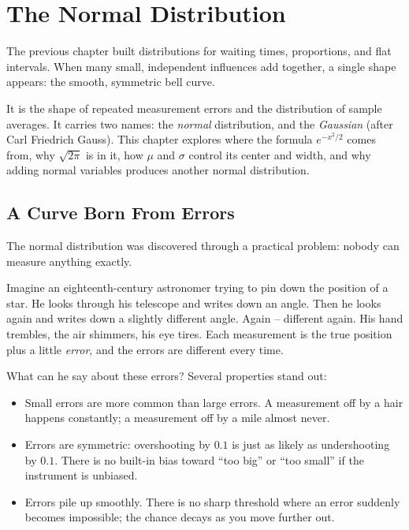 \chapter{The Normal Distribution}

The previous chapter built distributions for waiting times, proportions, and flat intervals. When many small, independent influences add together, a single shape appears: the smooth, symmetric bell curve.

It is the shape of repeated measurement errors and the distribution of sample averages. It carries two names: the \emph{normal} distribution, and the \emph{Gaussian} (after Carl Friedrich Gauss). This chapter explores where the formula $e^{-x^2/2}$ comes from, why $\sqrt{2\pi}$ is in it, how $\mu$ and $\sigma$ control its center and width, and why adding normal variables produces another normal distribution.

\chapterline

\section{A Curve Born From Errors}
\label{ch12:errors}

The normal distribution was discovered through a practical problem: nobody can measure anything exactly.

Imagine an eighteenth-century astronomer trying to pin down the position of a
star. He looks through his telescope and writes down an angle. Then he looks
again and writes down a slightly different angle. Again -- different again. His
hand trembles, the air shimmers, his eye tires. Each measurement is the true
position plus a little \emph{error}, and the errors are different every time.

What can he say about these errors? Several properties stand out:

\begin{itemize}
  \item Small errors are more common than large errors. A measurement off by a
  hair happens constantly; a measurement off by a mile almost never.
  \item Errors are symmetric: overshooting by $0.1$ is just as likely as
  undershooting by $0.1$. There is no built-in bias toward ``too big'' or ``too
  small'' if the instrument is unbiased.
  \item Errors pile up smoothly. There is no sharp threshold where an error
  suddenly becomes impossible; the chance decays as you move further out.
\end{itemize}

